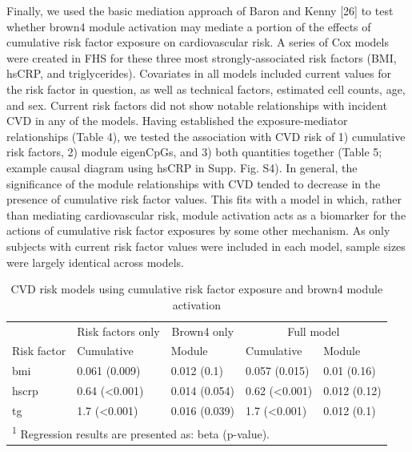\documentclass[]{article}
\theoremstyle{definition}
\theoremstyle{definition}
\theoremstyle{definition}
\theoremstyle{remark}
\begin{document}
Finally, we used the basic mediation approach of Baron and Kenny
{[}26{]} to test whether brown4 module activation may mediate a portion
of the effects of cumulative risk factor exposure on cardiovascular
risk. A series of Cox models were created in FHS for these three most
strongly-associated risk factors (BMI, hsCRP, and triglycerides).
Covariates in all models included current values for the risk factor in
question, as well as technical factors, estimated cell counts, age, and
sex. Current risk factors did not show notable relationships with
incident CVD in any of the models. Having established the
exposure-mediator relationships (Table 4), we tested the association
with CVD risk of 1) cumulative risk factors, 2) module eigenCpGs, and 3)
both quantities together (Table 5; example causal diagram using hsCRP in
Supp. Fig. S4). In general, the significance of the module relationships
with CVD tended to decrease in the presence of cumulative risk factor
values. This fits with a model in which, rather than mediating
cardiovascular risk, module activation acts as a biomarker for the
actions of cumulative risk factor exposures by some other mechanism. As
only subjects with current risk factor values were included in each
model, sample sizes were largely identical across models.

\begin{table}

\caption{\label{tab:module-mediation}CVD risk models using cumulative risk factor exposure and brown4 module activation}
\centering
\begin{tabular}[t]{lllll}
\toprule
\multicolumn{1}{c}{} & \multicolumn{1}{c}{Risk factors only} & \multicolumn{1}{c}{Brown4 only} & \multicolumn{2}{c}{Full model} \\
\cmidrule(l{2pt}r{2pt}){2-2} \cmidrule(l{2pt}r{2pt}){3-3} \cmidrule(l{2pt}r{2pt}){4-5}
Risk factor & Cumulative & Module & Cumulative & Module\\
\midrule
bmi & 0.061 (0.009) & 0.012 (0.1) & 0.057 (0.015) & 0.01 (0.16)\\
hscrp & 0.64 (<0.001) & 0.014 (0.054) & 0.62 (<0.001) & 0.012 (0.12)\\
tg & 1.7 (<0.001) & 0.016 (0.039) & 1.7 (<0.001) & 0.012 (0.1)\\
\bottomrule
\multicolumn{5}{l}{\textsuperscript{1} Regression results are presented as: beta (p-value).}\\
\end{tabular}
\end{table}
\end{document}
